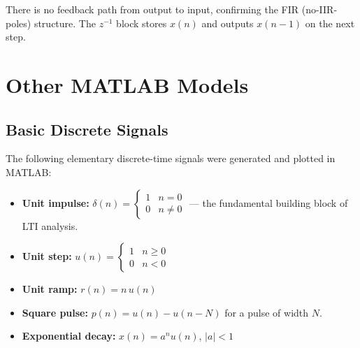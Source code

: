 \documentclass[11pt]{article}
\begin{document}
\begin{center}
\end{center}

There is no feedback path from output to input, confirming the FIR (no-IIR-poles) structure. The $z^{-1}$ block stores $x(n)$ and outputs $x(n-1)$ on the next step.

 
\section{Other MATLAB Models}

\subsection{Basic Discrete Signals}

The following elementary discrete-time signals were generated and plotted in MATLAB:

\begin{itemize}
  \item \textbf{Unit impulse:} $\delta(n) = \begin{cases} 1 & n = 0 \\ 0 & n \neq 0 \end{cases}$ — the fundamental building block of LTI analysis.
  \item \textbf{Unit step:} $u(n) = \begin{cases} 1 & n \geq 0 \\ 0 & n < 0 \end{cases}$
  \item \textbf{Unit ramp:} $r(n) = n\,u(n)$
  \item \textbf{Square pulse:} $p(n) = u(n) - u(n - N)$ for a pulse of width $N$.
  \item \textbf{Exponential decay:} $x(n) = a^n u(n)$, $|a| < 1$
\end{itemize}
\end{document}
